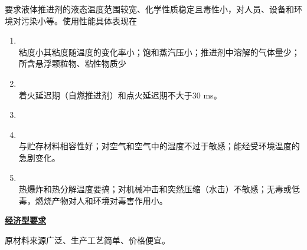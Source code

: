 要求液体推进剂的液态温度范围较宽、化学性质稳定且毒性小，对人员、设备和环境对污染小等。使用性能具体表现在
\vspace*{-0.5em}
\begin{enumerate}[\hspace*{1.5em} (1) ]
	\item \red[具有良好的运输型和输送性]\\
	粘度小其粘度随温度的变化率小；饱和蒸汽压小；推进剂中溶解的气体量少；所含悬浮颗粒物、粘性物质少
	\vspace*{-0.5em}
	
	\item \red[具有良好的点火和燃烧特性]\\
	着火延迟期（自燃推进剂）和点火延迟期不大于30 ms。
	
	\item \red[具有良好的冷却性能]
	\vspace*{-0.5em}
	
	\item \red[贮存稳定性好]\\
	与贮存材料相容性好；对空气和空气中的湿度不过于敏感；能经受环境温度的急剧变化。
	
	\item \red[具有良好的安全性能]\\
	热爆炸和热分解温度要搞；对机械冲击和突然压缩（水击）不敏感；无毒或低毒，燃烧产物对人和环境对毒害作用小。
\end{enumerate}

\noindent \textbf{\underline{经济型要求}}

原材料来源广泛、生产工艺简单、价格便宜。
\vspace*{0.5em}

